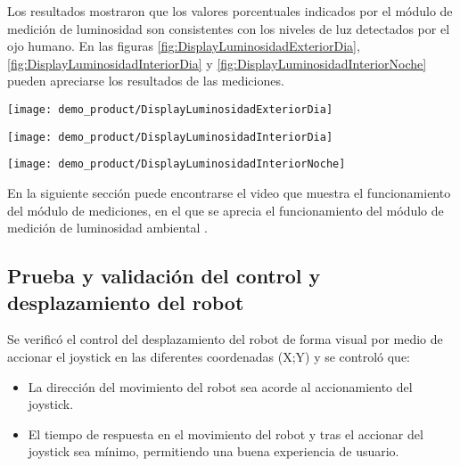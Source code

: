 Los resultados mostraron que los valores porcentuales indicados por el módulo de medición de luminosidad son consistentes con los niveles de luz detectados por el ojo humano. En las figuras \ref{fig:DisplayLuminosidadExteriorDia}, \ref{fig:DisplayLuminosidadInteriorDia} y \ref{fig:DisplayLuminosidadInteriorNoche} pueden apreciarse los resultados de las mediciones.

\begin{center}
\texttt{[image: demo\_product/DisplayLuminosidadExteriorDia]}
  \label{fig:DisplayLuminosidadExteriorDia}
\end{center}

\begin{center}
\texttt{[image: demo\_product/DisplayLuminosidadInteriorDia]}
  \label{fig:DisplayLuminosidadInteriorDia}
\end{center}

\begin{center}
\texttt{[image: demo\_product/DisplayLuminosidadInteriorNoche]}
  \label{fig:DisplayLuminosidadInteriorNoche}
\end{center}

En la siguiente sección puede encontrarse el video que muestra el funcionamiento del módulo de mediciones, en el que se aprecia el funcionamiento del módulo de medición de luminosidad ambiental \cite{Demo_Mediciones}.

\subsection{Prueba y validación del control y desplazamiento del robot}

Se verificó el control del desplazamiento del robot de forma visual por medio de accionar el joystick en las diferentes coordenadas (X;Y) y se controló que:

\begin{itemize}
	\item La dirección del movimiento del robot sea acorde al accionamiento del joystick.
	\item El tiempo de respuesta en el movimiento del robot y tras el accionar del joystick sea mínimo, permitiendo una buena experiencia de usuario.
\end{itemize}

